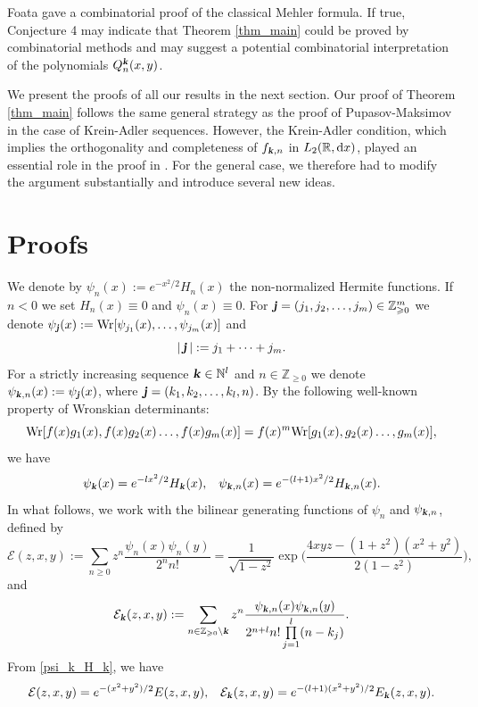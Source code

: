 \documentclass[12pt]{article}
\def\r{{\mathbb R}}
\def\wr{\textnormal{Wr}}
\def\z{{\mathbb Z}}
\def\n{{\mathbb N}}
\def\d{{\textnormal d}}
\def\k{\textbf{\textsl{k}}}
\def\j{\textbf{\textsl{j}}}
\begin{document}
Foata \cite{Foata1978} gave a combinatorial  proof of the classical Mehler formula. If true, Conjecture 4  may indicate that Theorem \ref{thm_main} could be proved by combinatorial methods and may suggest a potential combinatorial interpretation of the polynomials $Q_n^{\k}(x,y)$.

We present the proofs of all our results in the next section. 
Our proof of Theorem \ref{thm_main} follows the same general strategy as the proof of Pupasov-Maksimov \cite{Pupasov_2015} in the case of Krein-Adler sequences. However, the Krein-Adler condition, which implies the orthogonality and completeness of $f_{\k,n}$ in $L_2(\r, \d x)$, played an essential role in the proof in \cite{Pupasov_2015}. For the general case, we therefore had to modify the argument substantially
and introduce several new ideas.  

\section{Proofs}\label{section_proofs}

We denote by $\psi_n(x):=e^{-x^2/2} H_n(x)$ the non-normalized Hermite functions. If $n<0$  we set $H_n(x)\equiv 0$ and $\psi_n(x) \equiv 0$. For $\j=(j_1,j_2,\dots,j_m) \in \z_{\geqslant 0}^m$ we denote $\psi_{\j}(x):=\wr[\psi_{j_1}(x), \dots,\psi_{j_m}(x)]$ and
\[
|\,\j\,|:=j_1+\dots+j_m.
\]
For a strictly increasing sequence $\k \in \n^l$ and $n \in {\mathbb Z}_{\geqslant 0}$ we denote $\psi_{\k,n}(x):=\psi_{\j}(x)$, where $\j=(k_1,k_2,\dots,k_l,n)$. By the following well-known property of Wronskian determinants:
\begin{equation}\label{multiplication_identity}
\wr[f(x) g_1(x),f(x) g_2(x) \dots,f(x) g_{m}(x)]=f(x)^m \wr[ g_1(x), g_2(x) \dots, g_{m}(x)],
\end{equation}
we have 
\begin{equation}\label{psi_k_H_k}
\psi_{\k}(x)=e^{-l x^2/2} H_{\k}(x), \;\;\; \psi_{\k,n}(x)=e^{-(l+1) x^2/2} H_{\k,n}(x).
\end{equation}
In what follows, we work with the bilinear generating functions of $\psi_n$ and $\psi_{\k,n}$, defined by 
\begin{equation}\label{def_mathcal_E}
{\mathcal E}(z,x,y):=\sum\limits_{n\geqslant 0} z^n \frac{\psi_n(x) \psi_n(y)}{2^n n!}=
\frac{1}{\sqrt{1-z^2}} \exp\bigg( \frac{4xyz-(1+z^2)(x^2+y^2)}{2(1-z^2)} \bigg),
\end{equation}
and
\begin{equation}\label{def_mathcal_Ek}
{\mathcal E}_{\k}(z,x,y):=\sum\limits_{n \in \z_{\geqslant 0} \setminus \k}  z^n \frac{\psi_{\k,n}(x) \psi_{\k,n}(y)}{2^{n+l} n! \prod\limits_{j=1}^l (n-k_j)}.
\end{equation} 
From \eqref{psi_k_H_k}, we have 
\begin{equation}\label{mathcal_E_E}
{\mathcal E}(z,x,y)=e^{-(x^2+y^2)/2} E(z,x,y), \;\;\; 
{\mathcal E}_{\k}(z,x,y)=e^{-(l+1)(x^2+y^2)/2} E_{\k}(z,x,y).
\end{equation}
\end{document}
